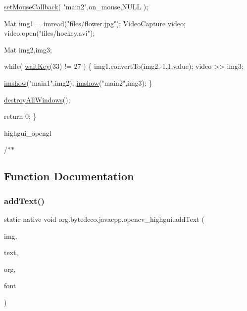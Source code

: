 \begin{DoxyPre}
\begin{DoxyCode}
    \hyperlink{group__highgui_gae53ffbc47967af79b35268d57575d6b4}{setMouseCallback}( \textcolor{stringliteral}{"main2"},on\_mouse,NULL );

    Mat img1 = imread(\textcolor{stringliteral}{"files/flower.jpg"});
    VideoCapture video;
    video.open(\textcolor{stringliteral}{"files/hockey.avi"});

    Mat img2,img3;

    \textcolor{keywordflow}{while}( \hyperlink{group__highgui_gaf924607bac022bb3603e459e3f2f3239}{waitKey}(33) != 27 )
    \{
        img1.convertTo(img2,-1,1,value);
        video >> img3;

        \hyperlink{group__highgui_gaf05d46739d8a87edb7405e79c7207975}{imshow}(\textcolor{stringliteral}{"main1"},img2);
        \hyperlink{group__highgui_gaf05d46739d8a87edb7405e79c7207975}{imshow}(\textcolor{stringliteral}{"main2"},img3);
    \}

    \hyperlink{group__highgui_gaff06efa4a5f234c304b6f498075abd1a}{destroyAllWindows}();

    \textcolor{keywordflow}{return} 0;
\}
\end{DoxyCode}
 \end{DoxyPre}
 

highgui\+\_\+opengl 

/$\ast$$\ast$ 

\subsection{Function Documentation}
\mbox{\label{group__highgui__qt_gaccc5f5d89abe18bc7adfd650dccb265f}} 
\subsubsection{\texorpdfstring{add\+Text()}{addText()}\hspace{0.1cm}{\footnotesize\ttfamily [1/2]}}
{\footnotesize\ttfamily static native void org.\+bytedeco.\+javacpp.\+opencv\+\_\+highgui.\+add\+Text (\begin{DoxyParamCaption}\item[{@Const @By\+Ref Mat}]{img,  }\item[{@Str Byte\+Pointer}]{text,  }\item[{@By\+Val Point}]{org,  }\item[{@Const @By\+Ref Qt\+Font}]{font }\end{DoxyParamCaption})\hspace{0.3cm}{\ttfamily [static]}}



